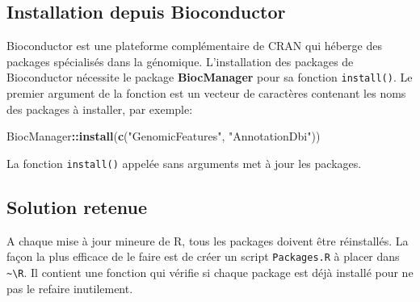 \documentclass[
  12pt,
  french,
  a4paper,
  extrafontsizes,onecolumn,openright
  ]{memoir}
\newenvironment{Shaded}{\begin{snugshade}}{\end{snugshade}}
\newcommand{\KeywordTok}[1]{\textcolor[rgb]{0.13,0.29,0.53}{\textbf{#1}}}
\newcommand{\NormalTok}[1]{#1}
\newcommand{\OperatorTok}[1]{\textcolor[rgb]{0.81,0.36,0.00}{\textbf{#1}}}
\newcommand{\StringTok}[1]{\textcolor[rgb]{0.31,0.60,0.02}{#1}}
\begin{document}
\hypertarget{installation-depuis-bioconductor}{%
\subsection{Installation depuis Bioconductor}\label{installation-depuis-bioconductor}}

Bioconductor est une plateforme complémentaire de CRAN qui héberge des packages spécialisés dans la génomique.
L'installation des packages de Bioconductor nécessite le package \textbf{BiocManager} pour sa fonction \texttt{install()}.
Le premier argument de la fonction est un vecteur de caractères contenant les noms des packages à installer, par exemple:

\scriptsize

\begin{Shaded}
\begin{Highlighting}[]
\NormalTok{BiocManager}\OperatorTok{::}\KeywordTok{install}\NormalTok{(}\KeywordTok{c}\NormalTok{(}\StringTok{"GenomicFeatures"}\NormalTok{, }\StringTok{"AnnotationDbi"}\NormalTok{))}
\end{Highlighting}
\end{Shaded}

\normalsize

La fonction \texttt{install()} appelée sans arguments met à jour les packages.

\hypertarget{solution-retenue}{%
\subsection{Solution retenue}\label{solution-retenue}}

A chaque mise à jour mineure de R, tous les packages doivent être réinstallés.
La façon la plus efficace de le faire est de créer un script \texttt{Packages.R} à placer dans \texttt{\textasciitilde{}\textbackslash{}R}.
Il contient une fonction qui vérifie si chaque package est déjà installé pour ne pas le refaire inutilement.

\scriptsize
\end{document}
